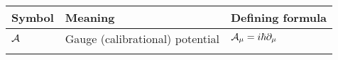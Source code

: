 

\begin{tabular} {@{}C{1.9cm}@{}p{8cm}@{}C{3.77cm}}
	\toprule
	\textbf{Symbol}& \textbf{Meaning}& \textbf{Defining formula}\\\bottomrule
	$\mathcal{A}$ & Gauge (calibrational) potential & $\mathcal{A}_\mu=i\hbar \partial_\mu$ \\

\bottomrule
{}
\end{tabular}

